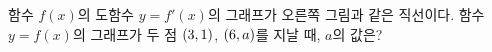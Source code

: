 \noindent\begin{minipage}[t]{0.58\linewidth}\vspace{0pt}\raggedright 함수 $f(x)$의 도함수 $y=f'(x)$의 그래프가 오른쪽 그림과 같은 직선이다. 함수 $y=f(x)$의 그래프가 두 점 $(3{,}\mkern3mu\mathopen{}1)$, $(6{,}\mkern3mu\mathopen{}a)$를 지날 때, $a$의 값은?\end{minipage}\hfill\begin{minipage}[t]{0.4\linewidth}\vspace{0pt}\centering \resizebox{\ifdim\width>\linewidth\linewidth\else\width\fi}{!}{}\end{minipage}\par
{}
